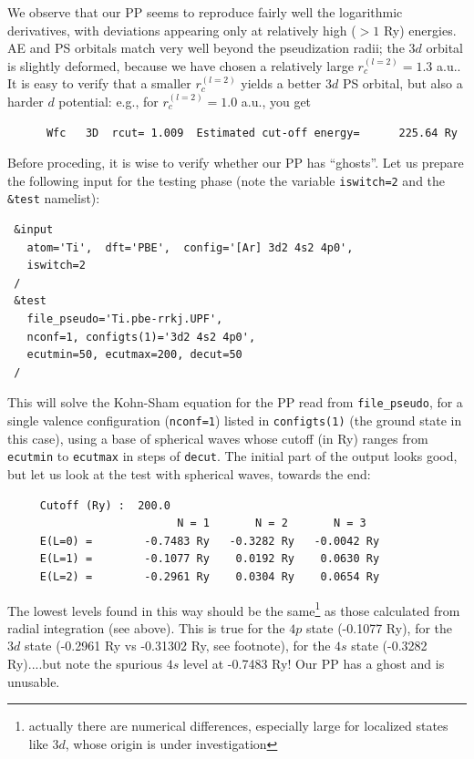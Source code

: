 \documentclass[12pt,a4paper]{article}
\begin{document}
We observe that our PP seems to reproduce fairly well
the logarithmic derivatives, with deviations appearing only at 
relatively high ($> 1$ Ry) energies. AE and PS orbitals match
very well beyond the pseudization radii; the $3d$ orbital is 
slightly deformed, because we have chosen a relatively large 
$r_c^{(l=2)}=1.3$ a.u.. It is easy to verify that a smaller
$r_c^{(l=2)}$ yields a better $3d$ PS orbital, but also a harder
$d$ potential: e.g., for $r_c^{(l=2)}=1.0$ a.u., you get
\begin{verbatim}
      Wfc   3D  rcut= 1.009  Estimated cut-off energy=      225.64 Ry
\end{verbatim}
Before proceding, it is wise to verify whether our PP has ``ghosts''.
Let us prepare the following input for the testing phase 
(note the variable \texttt{iswitch=2} and the \texttt{\&test}
namelist):
\begin{verbatim}
 &input
   atom='Ti',  dft='PBE',  config='[Ar] 3d2 4s2 4p0',
   iswitch=2
 /
 &test
   file_pseudo='Ti.pbe-rrkj.UPF',
   nconf=1, configts(1)='3d2 4s2 4p0',
   ecutmin=50, ecutmax=200, decut=50
 /
\end{verbatim}
This will solve the Kohn-Sham equation for the PP read from  
\texttt{file\_pseudo}, for a single valence configuration
(\texttt{nconf=1}) listed in \texttt{configts(1)} (the ground state
in this case), using a base of spherical waves whose cutoff
(in Ry) ranges from \texttt{ecutmin} to \texttt{ecutmax} in steps of
\texttt{decut}. The initial part of the output looks good, but let us
look at the test with spherical waves, towards the end:
\begin{verbatim}
     Cutoff (Ry) :  200.0
                          N = 1       N = 2       N = 3
     E(L=0) =        -0.7483 Ry   -0.3282 Ry   -0.0042 Ry
     E(L=1) =        -0.1077 Ry    0.0192 Ry    0.0630 Ry
     E(L=2) =        -0.2961 Ry    0.0304 Ry    0.0654 Ry
\end{verbatim}
The lowest levels found in this way should be the same\footnote{actually 
there are numerical differences, especially large for localized states 
like $3d$, whose origin is under investigation} 
as those calculated from radial integration (see above). 
This is true for the $4p$ state (-0.1077 Ry), 
for the $3d$ state (-0.2961 Ry vs -0.31302 Ry, see footnote),
for the $4s$ state (-0.3282 Ry)....but note the spurious $4s$ 
level at -0.7483 Ry! Our PP has a ghost and is unusable. 
\end{document}
